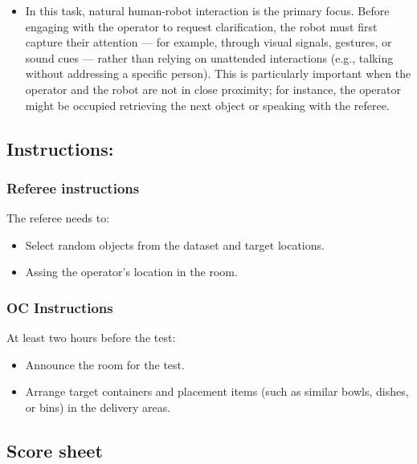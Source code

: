 \begin{enumerate}[nosep]
\begin{itemize}[nosep]
		\item In this task, natural human-robot interaction is the primary focus. Before engaging with the operator to request clarification, the robot must first capture their attention — for example, through visual signals, gestures, or sound cues — rather than relying on unattended interactions (e.g., talking without addressing a specific person). This is particularly important when the operator and the robot are not in close proximity; for instance, the operator might be occupied retrieving the next object or speaking with the referee.
	\end{itemize}
\end{enumerate}

\subsection*{Instructions:}
\subsubsection*{Referee instructions}

The referee needs to:
\begin{itemize}[nosep]
	\item Select random objects from the dataset and target locations.
	\item Assing the operator's location in the room.
\end{itemize}

\subsubsection*{OC Instructions}
At least two hours before the test:
\begin{itemize}[nosep]
	\item Announce the room for the test.
	\item Arrange target containers and placement items (such as similar bowls, dishes, or bins) in the delivery areas.
\end{itemize}

\subsection*{Score sheet}

